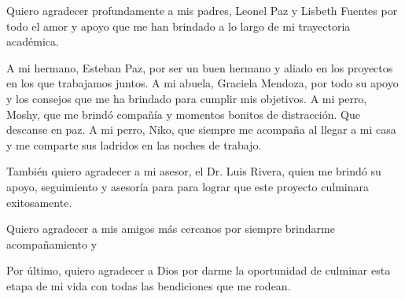 Quiero agradecer profundamente a mis padres, Leonel Paz y Lisbeth Fuentes por todo el amor y apoyo que me han brindado a lo largo de mi trayectoria académica. 

A mi hermano, Esteban Paz, por ser un buen hermano y aliado en los proyectos en los que trabajamos juntos. A mi abuela, Graciela Mendoza, por todo su apoyo y los consejos que me ha brindado para cumplir mis objetivos. A mi perro, Moshy, que me brindó compañía y momentos bonitos de distracción. Que descanse en paz. A mi perro, Niko, que siempre me acompaña al llegar a mi casa y me comparte sus ladridos en las noches de trabajo.

También quiero agradecer a mi asesor, el Dr. Luis Rivera, quien me brindó su apoyo, seguimiento y asesoría para para lograr que este proyecto culminara exitosamente.

Quiero agradecer a mis amigos más cercanos por siempre brindarme acompañamiento y 

Por último, quiero agradecer a Dios por darme la oportunidad de culminar esta etapa de mi vida con todas las bendiciones que me rodean.